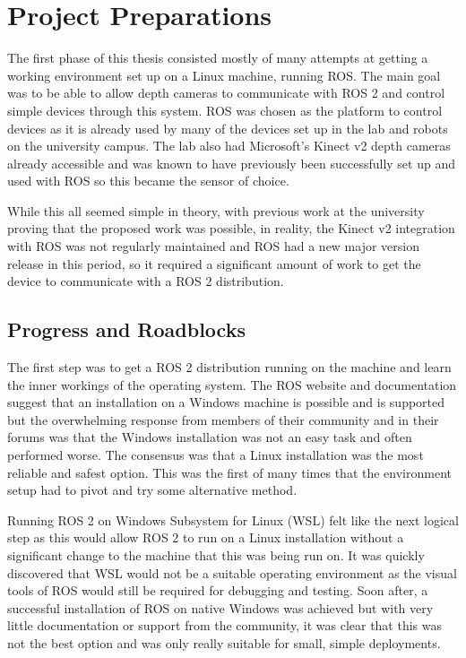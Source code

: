 \chapter{Project Preparations}\label{ch:project_prep}
The first phase of this thesis consisted mostly of many attempts at getting a working environment set up on a Linux machine, running ROS.
The main goal was to be able to allow depth cameras to communicate with ROS 2 and control simple devices through this system.
ROS was chosen as the platform to control devices as it is already used by many of the devices set up in the lab and robots on the university campus.
The lab also had Microsoft's Kinect v2 depth cameras already accessible and was known to have previously been successfully set up and used with ROS so this became the sensor of choice.

While this all seemed simple in theory, with previous work at the university proving that the proposed work was possible, in reality, the Kinect v2 integration with ROS was not regularly maintained and ROS had a new major version release in this period, so it required a significant amount of work to get the device to communicate with a ROS 2 distribution.

\section{Progress and Roadblocks}

The first step was to get a ROS 2 distribution running on the machine and learn the inner workings of the operating system.
The ROS website and documentation suggest that an installation on a Windows machine is possible and is supported but the overwhelming response from members of their community and in their forums was that the Windows installation was not an easy task and often performed worse.
The consensus was that a Linux installation was the most reliable and safest option.
This was the first of many times that the environment setup had to pivot and try some alternative method.

Running ROS 2 on Windows Subsystem for Linux (WSL) felt like the next logical step as this would allow ROS 2 to run on a Linux installation without a significant change to the machine that this was being run on.
It was quickly discovered that WSL would not be a suitable operating environment as the visual tools of ROS would still be required for debugging and testing.
Soon after, a successful installation of ROS on native Windows was achieved but with very little documentation or support from the community, it was clear that this was not the best option and was only really suitable for small, simple deployments.

